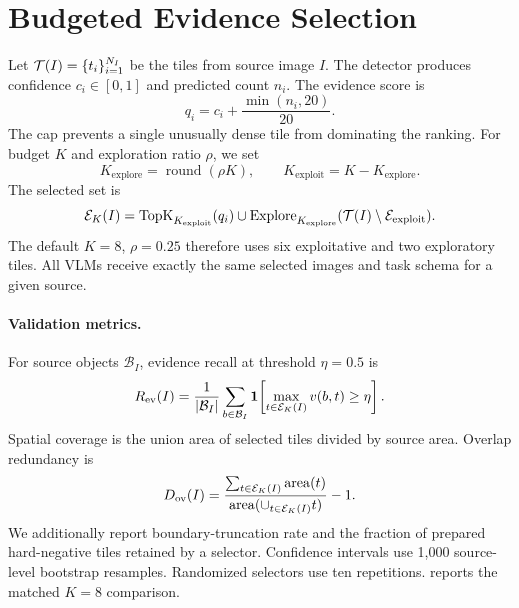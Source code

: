 \section{Budgeted Evidence Selection}
\label{sec:selector}

Let $\mathcal{T}(I)=\{t_i\}_{i=1}^{N_I}$ be the tiles from source image $I$.
The detector produces confidence $c_i\in[0,1]$ and predicted count $n_i$.
The evidence score is
\begin{equation}
q_i=c_i+\frac{\min(n_i,20)}{20}.
\label{eq:score}
\end{equation}
The cap prevents a single unusually dense tile from dominating the ranking.
For budget $K$ and exploration ratio $\rho$, we set
\begin{equation}
K_{\mathrm{explore}}=\operatorname{round}(\rho K),\qquad
K_{\mathrm{exploit}}=K-K_{\mathrm{explore}}.
\label{eq:allocation}
\end{equation}
The selected set is
\begin{equation}
\mathcal{E}_K(I)=
\operatorname{TopK}_{K_{\mathrm{exploit}}}(q_i)
\cup
\operatorname{Explore}_{K_{\mathrm{explore}}}
(\mathcal{T}(I)\setminus\mathcal{E}_{\mathrm{exploit}}).
\label{eq:selector}
\end{equation}
The default $K=8$, $\rho=0.25$ therefore uses six exploitative and two
exploratory tiles.  All VLMs receive exactly the same selected images and task
schema for a given source.

\paragraph{Validation metrics.}
For source objects $\mathcal{B}_I$, evidence recall at threshold $\eta=0.5$ is
\begin{equation}
R_{\mathrm{ev}}(I)=\frac{1}{|\mathcal{B}_I|}
\sum_{b\in\mathcal{B}_I}
\mathbf{1}\!\left[\max_{t\in\mathcal{E}_K(I)}v(b,t)\geq\eta\right].
\label{eq:evidence-recall}
\end{equation}
Spatial coverage is the union area of selected tiles divided by source area.
Overlap redundancy is
\begin{equation}
D_{\mathrm{ov}}(I)=
\frac{\sum_{t\in\mathcal{E}_K(I)}\operatorname{area}(t)}
{\operatorname{area}(\cup_{t\in\mathcal{E}_K(I)}t)}-1.
\label{eq:redundancy}
\end{equation}
We additionally report boundary-truncation rate and the fraction of prepared
hard-negative tiles retained by a selector.  Confidence intervals use 1,000
source-level bootstrap resamples.  Randomized selectors use ten repetitions.
 reports the matched $K=8$ comparison.

